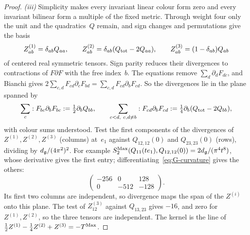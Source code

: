 \begin{proof}
\emph{(iii)} Simplicity makes every invariant linear colour form zero and every invariant bilinear form a multiple of the fixed metric. Through weight four only the unit and the quadratics~$Q$ remain, and sign changes and permutations give the basis
\begin{equation*}
Z^{(1)}_{ab}=\delta_{ab}Q_{aa},\qquad
Z^{(2)}_{ab}=\delta_{ab}(Q_{\rm tot}-2Q_{aa}),\qquad
Z^{(3)}_{ab}=(1-\delta_{ab})Q_{ab}
\end{equation*}
of centered real symmetric tensors. Sign parity reduces their divergences to contractions of $F\partial F$ with the free index~$b$. The equations remove $\sum_d\partial_dF_{dc}$, and Bianchi gives $2\sum_{c,d}F_{cd}\partial_cF_{bd}=\sum_{c,d}F_{cd}\partial_bF_{cd}$. So the divergences lie in the plane spanned by
\begin{equation*}
\sum_c:F_{bc}\partial_bF_{bc}: =\tfrac12\partial_bQ_{bb},\qquad
\sum_{c<d,\ c,d\ne b}:F_{cd}\partial_bF_{cd}: =\tfrac14\partial_b(Q_{\rm tot}-2Q_{bb}),
\end{equation*}
with colour sums understood. Test the first components of the divergences of $Z^{(1)},Z^{(2)},Z^{(3)}$ (columns) at~$e_1$ against $Q_{12,12}(0)$ and $Q_{23,23}(0)$ (rows), dividing by $d_{\mathfrak{g}}/(4\pi^2)^2$. For example $S^{\rm Max}_2(Q_{11}(te_1),Q_{12,12}(0))=2d_{\mathfrak{g}}/(\pi^4t^8)$, whose derivative gives the first entry; differentiating~\eqref{eq:G-curvature} gives the others:
\begin{equation}\label{eq:G-divergence-matrix}
\begin{pmatrix}-256&0&128\\0&-512&-128\end{pmatrix}.
\end{equation}
Its first two columns are independent, so divergence maps the span of the $Z^{(i)}$ onto this plane. The test of $Z^{(3)}_{12}$ against $Q_{13,23}$ gives $-16$, and zero for $Z^{(1)},Z^{(2)}$, so the three tensors are independent. The kernel is the line of $\tfrac12Z^{(1)}-\tfrac14Z^{(2)}+Z^{(3)}=-T^{\mathrm{Max}}$.


\end{proof}
